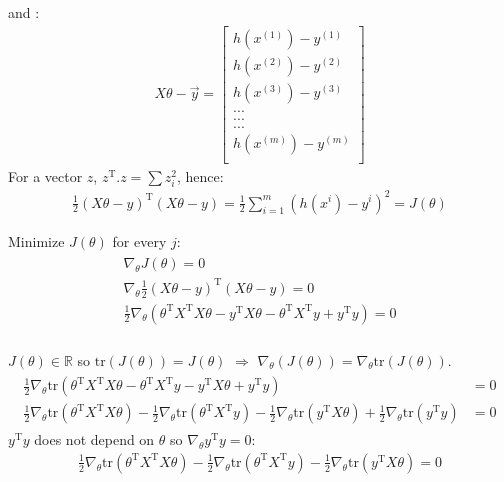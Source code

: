 \documentclass[a4paper,12pt]{report}
\begin{document}
and :
\begin{align*}
X \theta - \vec{y} = \begin{bmatrix} 
				h(x^{(1)}) - y^{(1)} \\
			  h(x^{(2)}) - y^{(2)} \\
			  h(x^{(3)}) - y^{(3)} \\
			  ... \\
			  ... \\
			  ... \\
			  h(x^{(m)}) - y^{(m)} \\
			\end{bmatrix}
\end{align*}
For a vector $z$, $z^{\mathrm{T}} . z = \sum z_i ^2$, hence:
\begin{align*}
\frac{1}{2} \left(X \theta - y \right)^{\mathrm{T}}\left(X \theta - y \right) = \frac{1}{2} \sum_{i=1} ^m \left(h(x^{i})-y^{i} \right)^2 = J(\theta)
\end{align*}

Minimize $J(\theta)$ for every $j$:
\begin{align*}
\begin{split}
 \nabla_{\theta} J(\theta) = 0 \\
 \nabla_{\theta}  \frac{1}{2} \left(X \theta - y \right)^{\mathrm{T}}\left(X \theta - y \right) = 0 \\
 \frac{1}{2}\nabla_{\theta} \left( \theta ^{\mathrm{T}} X^{\mathrm{T}}X \theta - y^{\mathrm{T}} X \theta - \theta^{\mathrm{T}} X ^{\mathrm{T}} y + y^{\mathrm{T}} y \right) = 0 \\
\end{split}
\end{align*}

$J(\theta) \in \mathbb{R}$ so $\mathrm{tr}(J(\theta)) = J(\theta)$ $\Rightarrow$  $\nabla _{\theta} (J(\theta)) = \nabla _{\theta} \mathrm{tr}(J(\theta))$.\\

\begin{align*}
\begin{split}
   \frac{1}{2}\nabla_{\theta} \mathrm{tr} \left( \theta^{\mathrm{T}} X^{\mathrm{T}} X \theta - \theta ^{\mathrm{T}} X^{\mathrm{T}} y - y^{\mathrm{T}} X \theta + y^{\mathrm{T}} y \right) & = 0\\
	 \frac{1}{2}\nabla_{\theta} \mathrm{tr} \left( \theta^{\mathrm{T}} X^{\mathrm{T}} X \theta \right) - \frac{1}{2}\nabla_{\theta} \mathrm{tr}\left( \theta ^{\mathrm{T}} X^{\mathrm{T}} y \right)  - \frac{1}{2}\nabla_{\theta} \mathrm{tr} \left(  y^{\mathrm{T}} X \theta \right ) + \frac{1}{2}\nabla_{\theta} \mathrm{tr} \left(  y^{\mathrm{T}} y \right) & = 0
	\end{split}
\end{align*}
$y^{\mathrm{T}}y$ does not depend on $\theta$ so $\nabla_{\theta} y^{\mathrm{T}}y = 0$:
\begin{align*}
	 \frac{1}{2}\nabla_{\theta} \mathrm{tr} \left( \theta^{\mathrm{T}} X^{\mathrm{T}} X \theta \right) - \frac{1}{2}\nabla_{\theta} \mathrm{tr}\left( \theta ^{\mathrm{T}} X^{\mathrm{T}} y \right)  - \frac{1}{2}\nabla_{\theta} \mathrm{tr} \left(  y^{\mathrm{T}} X \theta \right ) = 0
\end{align*}
\end{document}
